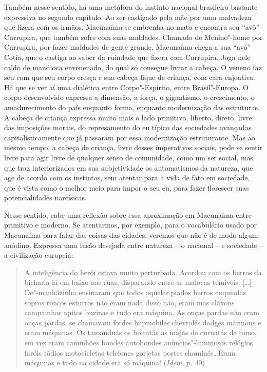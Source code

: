 Também nesse sentido, há uma metáfora do instinto nacional brasileiro
bastante expressiva no segundo capítulo. Ao ser castigado pela mãe por
uma malvadeza que fizera com os irmãos, Macunaíma se embrenha no mato e
encontra seu ``avô'' Currupira, que também sofre com suas maldades.
Chamado de Menino"-home por Currupira, por fazer maldades de gente
grande, Macunaíma chega a sua ``avó'' Cotia, que o castiga ao saber da
ruindade que fizera com Currupira. Joga nele caldo de mandioca
envenenado, do qual só consegue livrar a cabeça. O veneno faz seu com
que seu corpo cresça e sua cabeça fique de criança, com cara enjoativa.
Há que se ver aí uma dialética entre Corpo"-Espírito, entre
Brasil"-Europa. O corpo desenvolvido expressa a dimensão, a força, o
gigantismo, o crescimento, o amadurecimento do país enquanto forma,
enquanto modernização das estruturas. A cabeça de criança expressa muito
mais o lado primitivo, liberto, direto, livre das imposições morais, do
represamento do eu típico das sociedades avançadas capitalisticamente
que já passaram por essa modernização estruturante. Mas ao mesmo tempo,
a cabeça de criança, livre desses imperativos sociais, pode se sentir
livre para agir livre de qualquer senso de comunidade, como um ser
social, mas que traz interiorizados em sua subjetividade os automatismos
da natureza, que age de acordo com os instintos, sem atentar para a vida
de fato em sociedade, que é vista como o melhor meio para impor o seu
eu, para fazer florescer suas potencialidades narcísicas.

Nesse sentido, cabe uma reflexão sobre essa aproximação em Macunaíma
entre primitivo e moderno. Se atentarmos, por exemplo, para o
vocabulário usado por Macunaíma para falar das coisas das cidades,
veremos que não é de modo algum anódino. Expressa uma fusão desejada
entre natureza -- o nacional -- e sociedade -- a civilização europeia:

\begin{quote}
A inteligência do herói estava muito perturbada. Acordou com os berros
da bicharia lá em baixo nas ruas, disparando entre as malocas temíveis.
[\ldots{}] De"-manhãzinha ensinaram que todos aqueles piados berros
cuquiadas sopros roncos esturros não eram nada disso não, eram mas
cláxons campainhas apitos buzinas e tudo era máquina. As onças pardas
não eram onças pardas, se chamavam fordes hupmobiles chevrolés dodges
mármons e eram máquinas. Os tamanduás os boitatás as inajás de curuatás
de fumo, em vez eram caminhões bondes autobondes anúncios"-luminosos
relógios faróis rádios motocicletas telefones gorjetas postes
chaminés\ldots{}Eram máquinas e tudo na cidade era só máquina! (\emph{Idem},
p. 40)
\end{quote}

